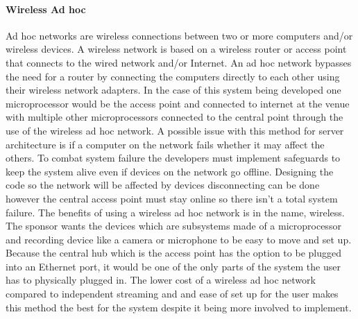 \documentclass[onecolumn, draftclsnofoot,10pt, compsoc]{IEEEtran}
\begin{document}
            \paragraph{Wireless Ad hoc}
            Ad hoc networks are wireless connections between two or more computers and/or wireless devices. A wireless network is based on a wireless router or access point that connects to the wired network and/or Internet. An ad hoc network bypasses the need for a router by connecting the computers directly to each other using their wireless network adapters. In the case of this system being developed one microprocessor would be the access point and connected to internet at the venue with multiple other microprocessors connected to the central point through the use of the wireless ad hoc network. A possible issue with this method for server  architecture is if a computer on the network fails whether it may affect the others. To combat system failure the developers must implement safeguards to keep the system alive even if devices on the network go offline. Designing the code so the network will be affected by devices disconnecting can be done however the central access point must stay online so there isn't a total system failure. The benefits of using a wireless ad hoc network is in the name, wireless. The sponsor wants the devices which are subsystems made of a microprocessor and recording device like a camera or microphone to be easy to move and set up. Because the central hub which is the access point has the option to be plugged into an Ethernet port, it would be one of the only parts of the system the user has to physically plugged in. The lower cost of a wireless ad hoc network compared to independent streaming and and ease of set up for the user makes this method the best for the system despite it being more involved to implement. 
    
    
\end{document}
